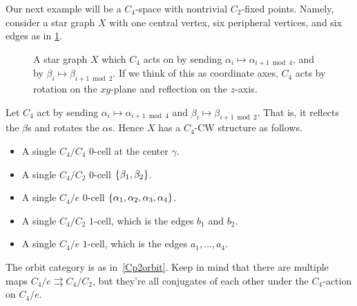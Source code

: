 \begin{exm}
Our next example will be a $C_4$-space with nontrivial $C_2$-fixed points. Namely, consider a star graph $X$ with
one central vertex, six peripheral vertices, and six edges as in \cref{star_graph}.
\begin{figure}[h!]
\caption{A star graph $X$ which $C_4$ acts on by sending $\alpha_i\mapsto\alpha_{i+1\bmod 4}$, and by
$\beta_i\mapsto\beta_{i+1\bmod 2}$. If we think of this as coordinate axes, $C_4$ acts by rotation on the
$xy$-plane and reflection on the $z$-axis.}
\label{star_graph}
\end{figure}

Let $C_4$ act by sending $\alpha_i\mapsto\alpha_{i+1\bmod 4}$ and $\beta_i\mapsto\beta_{i+1\bmod 2}$. That is, it
reflects the $\beta$s and rotates the $\alpha$s. Hence $X$ has a $C_4$-CW structure as follows.
\begin{itemize}
	\item A single $C_4/C_4$ $0$-cell at the center $\gamma$.
	\item A single $C_4/C_2$ $0$-cell $\{\beta_1,\beta_2\}$.
	\item A single $C_4/e$ $0$-cell $\{\alpha_1,\alpha_2,\alpha_3,\alpha_4\}$.
	\item A single $C_4/C_2$ $1$-cell, which is the edges $b_1$ and $b_2$.
	\item A single $C_4/e$ $1$-cell, which is the edges $a_1,\dotsc,a_4$.
\end{itemize}
The orbit category is as in~\eqref{Cp2orbit}. Keep in mind that there are multiple maps $C_4/e\rightrightarrows
C_4/C_2$, but they're all conjugates of each other under the $C_4$-action on $C_4/e$.


\end{exm}
